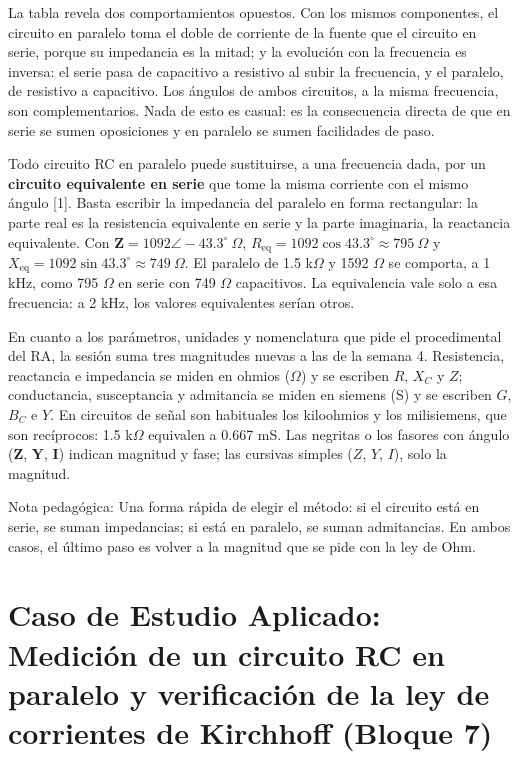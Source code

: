 \documentclass[11pt,letterpaper]{article}
\begin{document}
La tabla revela dos comportamientos opuestos. Con los mismos componentes, el circuito en paralelo toma el doble de corriente de la fuente que el circuito en serie, porque su impedancia es la mitad; y la evolución con la frecuencia es inversa: el serie pasa de capacitivo a resistivo al subir la frecuencia, y el paralelo, de resistivo a capacitivo. Los ángulos de ambos circuitos, a la misma frecuencia, son complementarios. Nada de esto es casual: es la consecuencia directa de que en serie se sumen oposiciones y en paralelo se sumen facilidades de paso.

Todo circuito RC en paralelo puede sustituirse, a una frecuencia dada, por un \textbf{circuito equivalente en serie} que tome la misma corriente con el mismo ángulo [1]. Basta escribir la impedancia del paralelo en forma rectangular: la parte real es la resistencia equivalente en serie y la parte imaginaria, la reactancia equivalente. Con $\mathbf{Z} = 1092 \angle -43.3^\circ\ \Omega$, $R_{\mathrm{eq}} = 1092 \cos 43.3^\circ \approx 795\ \Omega$ y $X_{\mathrm{eq}} = 1092 \sin 43.3^\circ \approx 749\ \Omega$. El paralelo de 1.5 k\ensuremath{\Omega} y 1592 \ensuremath{\Omega} se comporta, a 1 kHz, como 795 \ensuremath{\Omega} en serie con 749 \ensuremath{\Omega} capacitivos. La equivalencia vale solo a esa frecuencia: a 2 kHz, los valores equivalentes serían otros.

En cuanto a los parámetros, unidades y nomenclatura que pide el procedimental del RA, la sesión suma tres magnitudes nuevas a las de la semana 4. Resistencia, reactancia e impedancia se miden en ohmios (\ensuremath{\Omega}) y se escriben $R$, $X_C$ y $Z$; conductancia, susceptancia y admitancia se miden en siemens (S) y se escriben $G$, $B_C$ e $Y$. En circuitos de señal son habituales los kiloohmios y los milisiemens, que son recíprocos: 1.5 k\ensuremath{\Omega} equivalen a 0.667 mS. Las negritas o los fasores con ángulo ($\mathbf{Z}$, $\mathbf{Y}$, $\mathbf{I}$) indican magnitud y fase; las cursivas simples ($Z$, $Y$, $I$), solo la magnitud.

\begin{nota}{Nota pedagógica:}
Una forma rápida de elegir el método: si el circuito está en serie, se suman impedancias; si está en paralelo, se suman admitancias. En ambos casos, el último paso es volver a la magnitud que se pide con la ley de Ohm.
\end{nota}

\section{Caso de Estudio Aplicado: Medición de un circuito RC en paralelo y verificación de la ley de corrientes de Kirchhoff (Bloque 7)}
\end{document}
